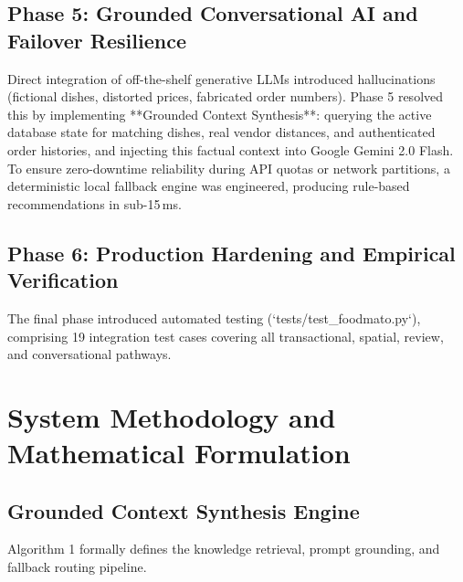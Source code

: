 \documentclass[conference]{IEEEtran}
\begin{document}
\subsection{Phase 5: Grounded Conversational AI and Failover Resilience}
Direct integration of off-the-shelf generative LLMs introduced hallucinations (fictional dishes, distorted prices, fabricated order numbers). Phase 5 resolved this by implementing **Grounded Context Synthesis**: querying the active database state for matching dishes, real vendor distances, and authenticated order histories, and injecting this factual context into Google Gemini 2.0 Flash. To ensure zero-downtime reliability during API quotas or network partitions, a deterministic local fallback engine was engineered, producing rule-based recommendations in sub-15\,ms.

\subsection{Phase 6: Production Hardening and Empirical Verification}
The final phase introduced automated testing (`tests/test_foodmato.py`), comprising 19 integration test cases covering all transactional, spatial, review, and conversational pathways.

\section{System Methodology and Mathematical Formulation}

\subsection{Grounded Context Synthesis Engine}
Algorithm 1 formally defines the knowledge retrieval, prompt grounding, and fallback routing pipeline.
\end{document}
